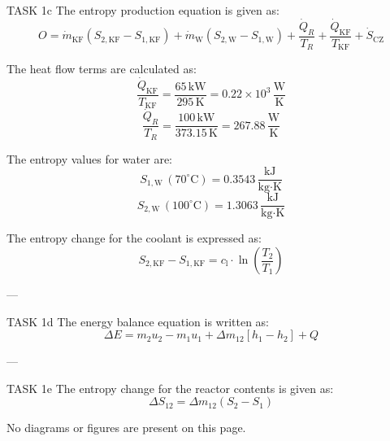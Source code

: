 TASK 1c  
The entropy production equation is given as:  
\[
O = \dot{m}_{\text{KF}} \left( S_{2,\text{KF}} - S_{1,\text{KF}} \right) + \dot{m}_{\text{W}} \left( S_{2,\text{W}} - S_{1,\text{W}} \right) + \frac{\dot{Q}_R}{T_R} + \frac{\dot{Q}_{\text{KF}}}{T_{\text{KF}}} + \dot{S}_{\text{CZ}}
\]  

The heat flow terms are calculated as:  
\[
\frac{\dot{Q}_{\text{KF}}}{T_{\text{KF}}} = \frac{65 \, \text{kW}}{295 \, \text{K}} = 0.22 \times 10^3 \, \frac{\text{W}}{\text{K}}
\]  
\[
\frac{\dot{Q}_R}{T_R} = \frac{100 \, \text{kW}}{373.15 \, \text{K}} = 267.88 \, \frac{\text{W}}{\text{K}}
\]  

The entropy values for water are:  
\[
S_{1,\text{W}} \, (70^\circ\text{C}) = 0.3543 \, \frac{\text{kJ}}{\text{kg·K}}
\]  
\[
S_{2,\text{W}} \, (100^\circ\text{C}) = 1.3063 \, \frac{\text{kJ}}{\text{kg·K}}
\]  

The entropy change for the coolant is expressed as:  
\[
S_{2,\text{KF}} - S_{1,\text{KF}} = c_{\text{l}} \cdot \ln \left( \frac{T_2}{T_1} \right)
\]  

---

TASK 1d  
The energy balance equation is written as:  
\[
\Delta E = m_{2} u_{2} - m_{1} u_{1} + \Delta m_{12} \left[ h_{1} - h_{2} \right] + Q
\]  

---

TASK 1e  
The entropy change for the reactor contents is given as:  
\[
\Delta S_{12} = \Delta m_{12} \left( S_{2} - S_{1} \right)
\]  

No diagrams or figures are present on this page.